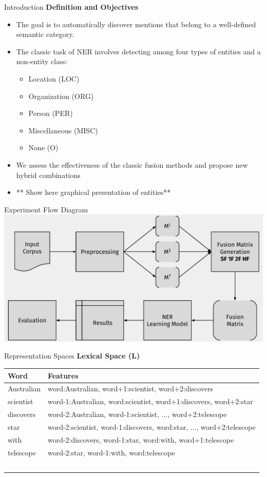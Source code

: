 \documentclass[10pt,xcolor=table]{beamer}
\begin{document}
\begin{frame}{Introduction}
\textbf{Definition and Objectives}
\begin{itemize}
\item  The goal is to automatically discover  mentions that belong to a well-defined semantic category. 
\item The classic task of NER involves detecting among four types of entities and a non-entity class:
	\begin{itemize}
	\item Location (LOC)
	\item Organization (ORG)
	\item Person (PER)
	\item Miscellaneous (MISC)
	\item None (O)
	\end{itemize}
\item We assess the effectiveness of the classic fusion methods and propose new hybrid combinations 
\item ** Show here graphical presentation of entities**
\end{itemize}
\end{frame}


\begin{frame}{Experiment Flow Diagram}
\centering
\includegraphics[width=0.85\linewidth]{image2/Chapitre4/diag_metodoNER.pdf}
\end{frame}


\begin{frame}{Representation Spaces}
\large \textbf{Lexical Space (L)}
\vspace{1cm}
\small

\begin{tabular}{ll}
	
	\hline 
	 \textbf{Word} & \textbf{Features} \\ 
	\hline 
	Australian & word:Australian, word+1:scientist, word+2:discovers\\ 
	scientist  &  word-1:Australian, word:scientist, word+1:discovers, word+2:star\\ 
	discovers & word-2:Australian, word-1:scientist, $\dots$, word+2:telescope \\ 
	star & word-2:scientist, word-1:discovers, word:star, $\dots$, word+2:telescope \\ 
	with & word-2:discovers, word-1:star, word:with, word+1:telescope \\ 
	telescope  &  word-2:star, word-1:with, word:telescope \\ 
	\hline \
\end{tabular} 
\vspace{\textheight}
\end{frame}
\end{document}
